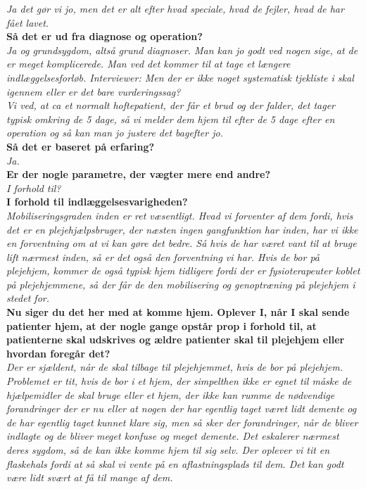 \noindent
\textit{ Ja det gør vi jo, men det er alt efter hvad speciale, hvad de fejler, hvad de har fået lavet.}  \\
\noindent
\textbf{Så det er ud fra diagnose og operation?} \\
\noindent
\textit{Ja og grundsygdom, altså grund diagnoser. Man kan jo godt ved nogen sige, at de er meget komplicerede. Man ved det kommer til at tage et længere indlæggelsesforløb.
Interviewer: Men der er ikke noget systematisk tjekliste i skal igennem eller er det bare vurderingssag?} \\
\noindent
\textit{Vi ved, at ca et normalt hoftepatient, der får et brud og der falder, det tager typisk omkring de 5 dage, så vi melder dem hjem til efter de 5 dage efter en operation og så kan man jo justere det bagefter jo.} \\
\noindent
\textbf{Så det er baseret på erfaring?} \\
\noindent
\textit{Ja.} \\
\noindent
\textbf{Er der nogle parametre, der vægter mere end andre? } \\
\noindent
\textit{I forhold til?} \\
\noindent
\textbf{I forhold til indlæggelsesvarigheden?} \\
\noindent
\textit{Mobiliseringsgraden inden er ret væsentligt. Hvad vi forventer af dem fordi, hvis det er en plejehjælpsbruger, der næsten ingen gangfunktion har inden, har vi ikke en forventning om at vi kan gøre det bedre. Så hvis de har været vant til at bruge lift nærmest inden,  så er det også den forventning vi har. Hvis de bor på plejehjem, kommer de også typisk hjem tidligere fordi der er fysioterapeuter koblet på plejehjemmene, så der får de den mobilisering og genoptræning på plejehjem i stedet for. } \\
\noindent
\textbf{Nu siger du det her med at komme hjem. Oplever I, når I skal sende patienter hjem, at der nogle gange opstår prop i forhold til, at patienterne skal udskrives og ældre patienter skal til plejehjem eller hvordan foregår det? } \\
\noindent
\textit{Der er sjældent, når de skal tilbage til plejehjemmet, hvis de bor på plejehjem. Problemet er tit, hvis de bor i et hjem, der simpelthen ikke er egnet til måske de hjælpemidler de skal bruge eller et hjem, der ikke kan rumme de nødvendige forandringer der er nu eller at nogen der har egentlig taget været lidt demente og de har egentlig taget kunnet klare sig, men så sker der forandringer, når de bliver indlagte og de bliver meget konfuse og meget demente. Det eskalerer nærmest deres sygdom, så de kan ikke komme hjem til sig selv. Der oplever vi tit en flaskehals fordi at så skal vi vente på en aflastningsplads til dem. Det kan godt være lidt svært at få til mange af dem.} \\
